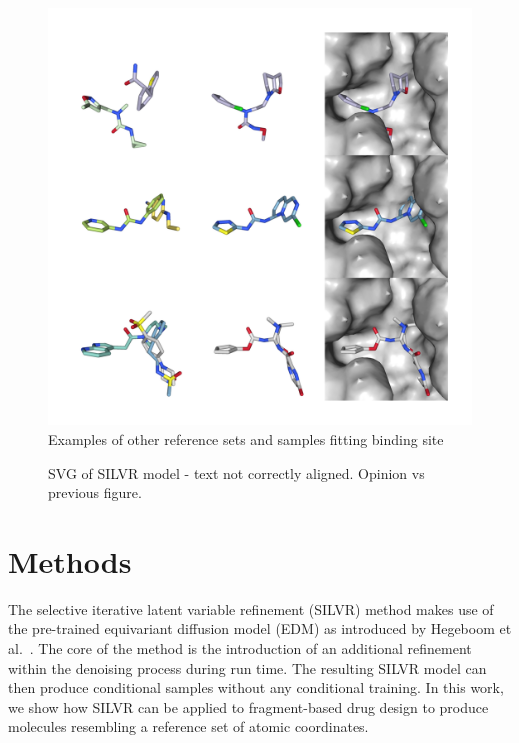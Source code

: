 \documentclass[journal=jacsat,manuscript=article]{achemso}
\begin{document}
\begin{figure}
    \centering
    \includegraphics[width=\textwidth]{Figures/fragment_sample_bound.png}
    \caption{Examples of other reference sets and samples fitting binding site}
    \label{fig:fig_5}
\end{figure}


\begin{figure}
    \centering
    
    \caption{SVG of SILVR model - text not correctly aligned. Opinion vs previous figure.}
    \label{fig:fig_6}
\end{figure}


\section{Methods}
The selective iterative latent variable refinement (SILVR) method makes use of the pre-trained equivariant diffusion model (EDM) as introduced by Hegeboom et al.~\cite{}. The core of the method is the introduction of an additional refinement within the denoising process during run time. The resulting SILVR model can then produce conditional samples without any conditional training. In this work, we show how SILVR can be applied to fragment-based drug design to produce molecules resembling a reference set of atomic coordinates. 
\end{document}
